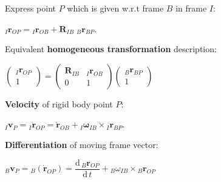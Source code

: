 \documentclass[landscape]{article}
\newcommand{\vmspace}{\vspace{-7pt}}
\newcommand{\vpspace}{\vspace{5pt}}
\begin{document}
\begin{multicols}{3}
\vpspace

\begin{minipage}{\columnwidth}
  Express point $P$ which is given w.r.t frame $B$ in frame $I$:
  \vmspace
  \begin{center}
  ${}_I\mathbf{r}_{OP} = {}_I\mathbf{r}_{OB} +
  \mathbf{R}_{IB}\;{}_B\mathbf{r}_{BP}$.
  \end{center}
\end{minipage}

\vpspace

\begin{minipage}{\columnwidth}
  Equivalent \textbf{homogeneous transformation} description:
  \vmspace
  \begin{center}
    $\left(\begin{matrix}
      {}_I\mathbf{r}_{OP} \\
      1
    \end{matrix}\right)
    =
    \left(\begin{matrix}
      \mathbf{R}_{IB} & {}_I\mathbf{r}_{OB} \\
      0 & 1
    \end{matrix}\right)
    \left(\begin{matrix}
      {}_B\mathbf{r}_{BP} \\
      1
    \end{matrix}\right)$
  \end{center}
\end{minipage}

\vpspace

\begin{minipage}{\columnwidth}
  \textbf{Velocity} of rigid body point $P$:
  \vmspace
  \begin{center}
    ${}_I \mathbf v_P = {}_I \mathbf{\dot r}_{OP} = \mathbf{\dot r}_{OB} +
    {}_I\mathbf{\omega}_{IB} \times {}_I\mathbf r_{BP}.$
  \end{center}
\end{minipage}

\vpspace

\begin{minipage}{\columnwidth}
  \textbf{Differentiation} of moving frame vector:
  \vmspace
  \begin{center}
    ${}_B\mathbf v_P = {}_B\left(\mathbf{\dot r}_{OP}\right) = \dfrac{\mathrm
    d\, {}_B\mathbf r_{OP}}{\mathrm d \,t} + {}_B\omega_{IB} \times {}_B\mathbf
    r_{OP}$
  \end{center}
\end{minipage}


\end{multicols}
\end{document}
